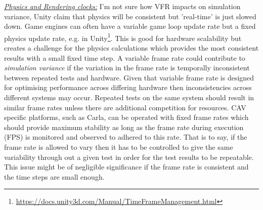 \documentclass[letterpaper, 10 pt, journal, twoside]{IEEEtran}
\begin{document}
%
%
\noindent\underline{\textit{Physics and Rendering clocks:}}
I'm not sure how VFR impacts on simulation variance, Unity claim that physics will be consistent but 'real-time' is just slowed down.
Game engines can often have a variable game loop update rate but a fixed physics update rate, e.g. in Unity\footnote{\url{https://docs.unity3d.com/Manual/TimeFrameManagement.html}}. This is good for hardware scalability but creates a challenge for the physics calculations which provides the most consistent results with a small fixed time step. %
%
A variable frame rate could contribute to \textit{simulation variance} if the variation in the frame rate is temporally inconsistent between repeated tests and hardware. Given that variable frame rate is designed for optimising performance across differing hardware then inconsistencies across different systems may occur. Repeated tests on the same system should result in similar frame rates unless there are additional competition for resources. 
%
CAV specific platforms, such as Carla, can be operated with fixed frame rates which should provide maximum stability as long as the frame rate during execution (FPS) is monitored and observed to adhered to this rate.
%
That is to say, if the frame rate is allowed to vary then it has to be controlled to give the same variability through out a given test in order for the test results to be repeatable. This issue might be of negligible significance if the frame rate is consistent and the time steps are small enough. 
\end{document}
